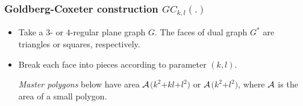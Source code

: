 \documentclass{beamer}
\begin{document}
\begin{frame}\frametitle{Goldberg-Coxeter construction $GC_{k,l}(.)$}
\vspace{-2.5mm}
\begin{itemize}
\item Take a $3$- or $4$-regular plane graph $G$. The faces of dual graph 
$G^{*}$ are triangles or squares, respectively.
\item Break each face
into pieces according to parameter 
$(k,l)$.

{\em Master polygons}
below have area $\cal{A}$$(k^2$+$kl$+$l^2)$ or $\cal{A}$$(k^2$+$l^2)$, where  $\cal{A}$ is the area of 
 a small 
polygon.
\end{itemize}
\begin{center}
\end{center}

\end{frame}
\end{document}
